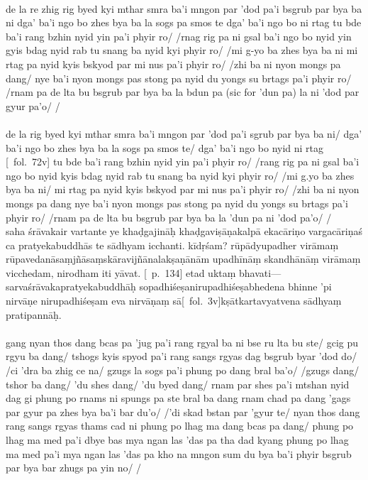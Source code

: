 \documentclass[12pt]{article}
\newcommand{\emdash} {\hspace{0em}—\hspace{0em}}
\begin{document}
\textbf{\TVA}\\
de la re zhig rig byed kyi mthar smra ba'i mngon par 'dod pa'i bsgrub par bya ba ni dga' ba'i ngo bo zhes bya ba la sogs pa smos te dga' ba'i ngo bo ni rtag tu bde ba'i rang bzhin nyid yin pa'i phyir ro/ /rnag rig pa ni gsal ba'i ngo bo nyid yin gyis bdag nyid rab tu snang ba nyid kyi phyir ro/ /mi g-yo ba zhes bya ba ni mi rtag pa nyid kyis bskyod par mi nus pa'i phyir ro/ /zhi ba ni nyon mongs pa dang/ nye ba'i nyon mongs pas stong pa nyid du yongs su brtags pa'i phyir ro/ /rnam pa de lta bu bsgrub par bya ba la bdun pa (sic for 'dun pa) la ni 'dod par gyur pa'o/ /\\

\textbf{\TVB}\\
de la rig byed kyi mthar smra ba'i mngon par 'dod pa'i sgrub par bya ba ni/ dga' ba'i ngo bo zhes bya ba la sogs pa smos te/ dga' ba'i ngo bo nyid ni rtag [\TVB\ fol.\ 72v] tu bde ba'i rang bzhin nyid yin pa'i phyir ro/ /rang rig pa ni gsal ba'i ngo bo nyid kyis bdag nyid rab tu snang ba nyid kyi phyir ro/ /mi g.yo ba zhes bya ba ni/ mi rtag pa nyid kyis bskyod par mi nus pa'i phyir ro/ /zhi ba ni nyon mongs pa dang nye ba'i nyon mongs pas stong pa nyid du yongs su brtags pa'i phyir ro/ /rnam pa de lta bu bsgrub par bya ba la 'dun pa ni 'dod pa'o/ /\\

saha śrāvakair vartante ye khaḍgajināḥ khaḍgaviṣāṇakalpā ekacāriṇo vargacāriṇaś\footnoteB{
	vargacāriṇaś] \MS\ (\emph{cf.\ Abhidharmakośabhāṣya}); vanacāriṇaś \EDD 
} ca pratyekabuddhās te sādhyam icchanti.
kīdṛśam?
rūpādyupadher virāmaṃ rūpavedanāsaṃjñāsaṃskāravijñānalakṣaṇānām upadhīnāṃ skandhānāṃ virāmaṃ vicchedam, nirodham iti yāvat.
[\EDD\ p.\ 134] etad uktaṃ bhavati\emdash sarvaśrāvakapratyekabuddhāḥ sopadhiśeṣanirupadhiśeṣabhedena bhinne 'pi nirvāṇe\footnoteB{
	nirvāṇe] \EDD ; nirvāṇa° \MS
} nirupadhiśeṣam eva nirvāṇaṃ sā[\MS\ fol.\ 3v]kṣātkartavyatvena sādhyaṃ pratipannāḥ.\\

\textbf{\TVA}\\
gang nyan thos dang bcas pa 'jug pa'i rang rgyal ba ni bse ru lta bu ste/ gcig pu rgyu ba dang/ tshogs kyis spyod pa'i rang sangs rgyas dag bsgrub byar 'dod do/ /ci 'dra ba zhig ce na/ gzugs la sogs pa'i phung po dang bral ba'o/ /gzugs dang/ tshor ba dang/ 'du shes dang/ 'du byed dang/ rnam par shes pa'i mtshan nyid dag gi phung po rnams ni spungs pa ste bral ba dang rnam chad pa dang 'gags par gyur pa zhes bya ba'i bar du'o/ /'di skad bstan par 'gyur te/ nyan thos dang rang sangs rgyas thams cad ni phung po lhag ma dang bcas pa dang/ phung po lhag ma med pa'i dbye bas mya ngan las 'das pa tha dad kyang phung po lhag ma med pa'i mya ngan las 'das pa kho na mngon sum du bya ba'i phyir bsgrub par bya bar zhugs pa yin no/ /\\
\end{document}
